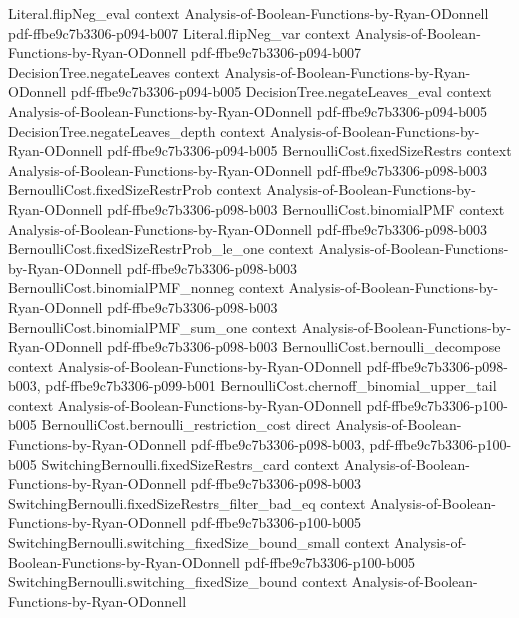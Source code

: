 \begin{theorem}
\proofstep
  {Literal.flipNeg_eval}
  {context}
  {Analysis-of-Boolean-Functions-by-Ryan-ODonnell}
  {pdf-ffbe9c7b3306-p094-b007}
\proofstep
  {Literal.flipNeg_var}
  {context}
  {Analysis-of-Boolean-Functions-by-Ryan-ODonnell}
  {pdf-ffbe9c7b3306-p094-b007}
\proofstep
  {DecisionTree.negateLeaves}
  {context}
  {Analysis-of-Boolean-Functions-by-Ryan-ODonnell}
  {pdf-ffbe9c7b3306-p094-b005}
\proofstep
  {DecisionTree.negateLeaves_eval}
  {context}
  {Analysis-of-Boolean-Functions-by-Ryan-ODonnell}
  {pdf-ffbe9c7b3306-p094-b005}
\proofstep
  {DecisionTree.negateLeaves_depth}
  {context}
  {Analysis-of-Boolean-Functions-by-Ryan-ODonnell}
  {pdf-ffbe9c7b3306-p094-b005}
\proofstep
  {BernoulliCost.fixedSizeRestrs}
  {context}
  {Analysis-of-Boolean-Functions-by-Ryan-ODonnell}
  {pdf-ffbe9c7b3306-p098-b003}
\proofstep
  {BernoulliCost.fixedSizeRestrProb}
  {context}
  {Analysis-of-Boolean-Functions-by-Ryan-ODonnell}
  {pdf-ffbe9c7b3306-p098-b003}
\proofstep
  {BernoulliCost.binomialPMF}
  {context}
  {Analysis-of-Boolean-Functions-by-Ryan-ODonnell}
  {pdf-ffbe9c7b3306-p098-b003}
\proofstep
  {BernoulliCost.fixedSizeRestrProb_le_one}
  {context}
  {Analysis-of-Boolean-Functions-by-Ryan-ODonnell}
  {pdf-ffbe9c7b3306-p098-b003}
\proofstep
  {BernoulliCost.binomialPMF_nonneg}
  {context}
  {Analysis-of-Boolean-Functions-by-Ryan-ODonnell}
  {pdf-ffbe9c7b3306-p098-b003}
\proofstep
  {BernoulliCost.binomialPMF_sum_one}
  {context}
  {Analysis-of-Boolean-Functions-by-Ryan-ODonnell}
  {pdf-ffbe9c7b3306-p098-b003}
\proofstep
  {BernoulliCost.bernoulli_decompose}
  {context}
  {Analysis-of-Boolean-Functions-by-Ryan-ODonnell}
  {pdf-ffbe9c7b3306-p098-b003,
    pdf-ffbe9c7b3306-p099-b001}
\proofstep
  {BernoulliCost.chernoff_binomial_upper_tail}
  {context}
  {Analysis-of-Boolean-Functions-by-Ryan-ODonnell}
  {pdf-ffbe9c7b3306-p100-b005}
\proofstep
  {BernoulliCost.bernoulli_restriction_cost}
  {direct}
  {Analysis-of-Boolean-Functions-by-Ryan-ODonnell}
  {pdf-ffbe9c7b3306-p098-b003,
    pdf-ffbe9c7b3306-p100-b005}
\proofstep
  {SwitchingBernoulli.fixedSizeRestrs_card}
  {context}
  {Analysis-of-Boolean-Functions-by-Ryan-ODonnell}
  {pdf-ffbe9c7b3306-p098-b003}
\proofstep
  {SwitchingBernoulli.fixedSizeRestrs_filter_bad_eq}
  {context}
  {Analysis-of-Boolean-Functions-by-Ryan-ODonnell}
  {pdf-ffbe9c7b3306-p100-b005}
\proofstep
  {SwitchingBernoulli.switching_fixedSize_bound_small}
  {context}
  {Analysis-of-Boolean-Functions-by-Ryan-ODonnell}
  {pdf-ffbe9c7b3306-p100-b005}
\proofstep
  {SwitchingBernoulli.switching_fixedSize_bound}
  {context}
  {Analysis-of-Boolean-Functions-by-Ryan-ODonnell}

\end{theorem}
